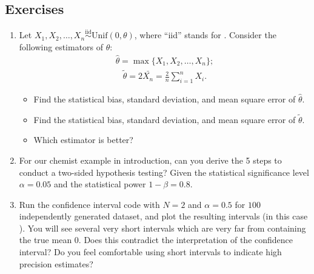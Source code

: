 \documentclass[letterpaper,11pt,english]{sphinxmanual}
\begin{document}
\subsection{Exercises}
\label{\detokenize{chapter_appendix_math/statistics:exercises}}\begin{enumerate}
%
\item {} 
Let
\(X_1, X_2, \ldots, X_n \overset{\text{iid}}{\sim} \mathrm{Unif}(0, \theta)\),
where “iid” stands for .
Consider the following estimators of \(\theta\):
\begin{equation}\label{equation:chapter_appendix_math/statistics:chapter_appendix_math/statistics:8}
\begin{split}\hat{\theta} = \max \{X_1, X_2, \ldots, X_n \};\end{split}
\end{equation}\begin{equation}\label{equation:chapter_appendix_math/statistics:chapter_appendix_math/statistics:9}
\begin{split}\tilde{\theta} = 2 \bar{X_n} = \frac{2}{n} \sum_{i=1}^n X_i.\end{split}
\end{equation}\begin{itemize}
\item {} 
Find the statistical bias, standard deviation, and mean square
error of \(\hat{\theta}.\)

\item {} 
Find the statistical bias, standard deviation, and mean square
error of \(\tilde{\theta}.\)

\item {} 
Which estimator is better?

\end{itemize}

\item {} 
For our chemist example in introduction, can you derive the 5 steps
to conduct a two-sided hypothesis testing? Given the statistical
significance level \(\alpha = 0.05\) and the statistical power
\(1 - \beta = 0.8\).

\item {} 
Run the confidence interval code with \(N=2\) and
\(\alpha = 0.5\) for \(100\) independently generated dataset,
and plot the resulting intervals (in this case ). You
will see several very short intervals which are very far from
containing the true mean \(0\). Does this contradict the
interpretation of the confidence interval? Do you feel comfortable
using short intervals to indicate high precision estimates?

\end{enumerate}
\end{document}
